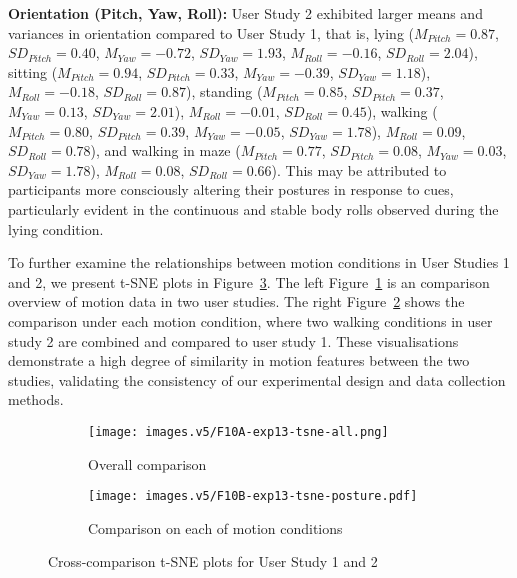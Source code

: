 \noindent\textbf{Orientation (Pitch, Yaw, Roll):} User Study 2 exhibited larger means and variances in orientation compared to User Study 1, that is, lying ($M_{Pitch} = 0.87$, $SD_{Pitch} = 0.40$, $M_{Yaw} = -0.72$, $SD_{Yaw} = 1.93$, $M_{Roll} = -0.16$, $SD_{Roll} = 2.04$),  sitting ($M_{Pitch} = 0.94$, $SD_{Pitch} = 0.33$, $M_{Yaw} = -0.39$, $SD_{Yaw} = 1.18$), $M_{Roll} = -0.18$, $SD_{Roll} = 0.87$), standing ($M_{Pitch} = 0.85$, $SD_{Pitch} = 0.37$, $M_{Yaw} = 0.13$, $SD_{Yaw} = 2.01$), $M_{Roll} = -0.01$, $SD_{Roll} = 0.45$), walking ($M_{Pitch} = 0.80$, $SD_{Pitch} = 0.39$, $M_{Yaw} = -0.05$, $SD_{Yaw} = 1.78$), $M_{Roll} = 0.09$, $SD_{Roll} = 0.78$), and walking in maze ($M_{Pitch} = 0.77$, $SD_{Pitch} = 0.08$, $M_{Yaw} = 0.03$, $SD_{Yaw} = 1.78$), $M_{Roll} = 0.08$, $SD_{Roll} = 0.66$). This may be attributed to participants more consciously altering their postures in response to cues, particularly evident in the continuous and stable body rolls observed during the lying condition.

To further examine the relationships between motion conditions in User Studies 1 and 2, we present t-SNE plots in Figure~\ref{fig:user-study-1-2-comparison}. The left Figure~\ref{fig:exp13-tsne-all} is an comparison overview of motion data in two user studies. The right Figure~\ref{fig:exp13-tsne-posture} shows the comparison under each motion condition, where two walking conditions in user study 2 are combined and compared to user study 1. These visualisations demonstrate a high degree of similarity in motion features between the two studies, validating the consistency of our experimental design and data collection methods.


\begin{figure}[!htbp]
    \begin{subfigure}{0.45\textwidth}
        \centering
    \texttt{[image: images.v5/F10A-exp13-tsne-all.png]}
    \caption{Overall comparison}
    \label{fig:exp13-tsne-all}
    \end{subfigure}
    \begin{subfigure}{0.52\textwidth}
        \centering
         \texttt{[image: images.v5/F10B-exp13-tsne-posture.pdf]}
    \caption{Comparison on each of motion conditions}
    \label{fig:exp13-tsne-posture}
    \end{subfigure}
    \caption{Cross-comparison t-SNE plots for User Study 1 and 2}
    \label{fig:user-study-1-2-comparison}
\end{figure}


